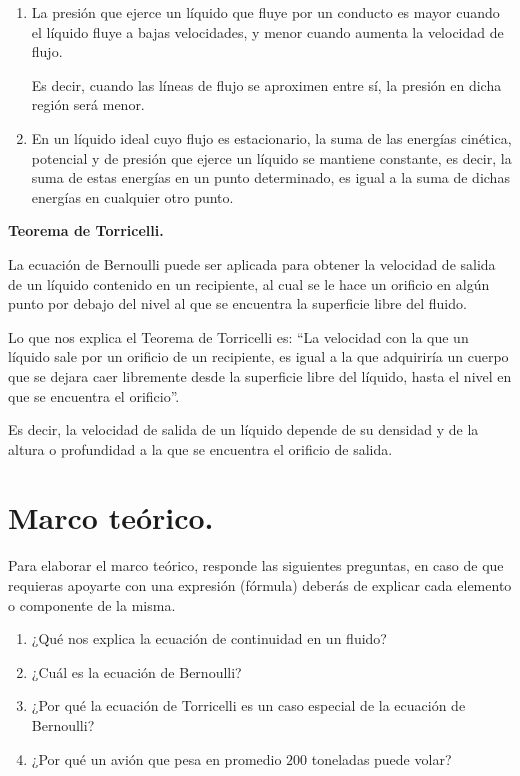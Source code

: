 \documentclass[14pt]{extarticle}
\begin{document}
\begin{enumerate}
\item La presión que ejerce un líquido que fluye por un conducto es mayor cuando el líquido fluye a bajas velocidades, y menor cuando aumenta la velocidad de flujo.

Es decir, cuando las líneas de flujo se aproximen entre sí, la presión en dicha región será menor.
\item En un líquido ideal cuyo flujo es estacionario, la suma de las energías cinética, potencial y de presión que ejerce un líquido se mantiene constante, es decir, la suma de estas energías en un punto determinado, es igual a la suma de dichas energías en cualquier otro punto.
\end{enumerate}

\textbf{Teorema de Torricelli.}

La ecuación de Bernoulli puede ser aplicada para obtener la velocidad de salida de un líquido contenido en un recipiente, al cual se le hace un orificio en algún punto por debajo del nivel al que se encuentra la superficie libre del fluido.

Lo que nos explica el Teorema de Torricelli es: \enquote{La velocidad con la que un líquido sale por un orificio de un recipiente, es igual a la que adquiriría un cuerpo que se dejara caer libremente desde la superficie libre del líquido, hasta el nivel en que se encuentra el orificio}.

Es decir, la velocidad de salida de un líquido depende de su densidad y de la altura o profundidad a la que se encuentra el orificio de salida.

\section{Marco teórico.}

Para elaborar el marco teórico, responde las siguientes preguntas, en caso de que requieras apoyarte con una expresión (fórmula) deberás de explicar cada elemento o componente de la misma.

\begin{enumerate}
\item ¿Qué nos explica la ecuación de continuidad en un fluido?
\item ¿Cuál es la ecuación de Bernoulli?
\item ¿Por qué la ecuación de Torricelli es un caso especial de la ecuación de Bernoulli?
\item ¿Por qué un avión que pesa en promedio $200$ toneladas puede volar?
\end{enumerate}
\end{document}
